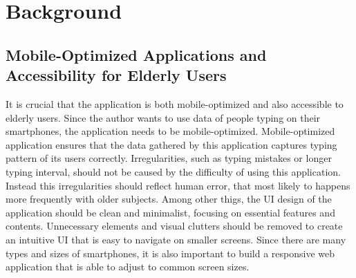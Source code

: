 \chapter{Background}


\section{Mobile-Optimized Applications and Accessibility for Elderly Users}

It is crucial that the application is both mobile-optimized and also accessible to elderly users.
Since the author wants to use data of people typing on their smartphones, the application needs to be mobile-optimized.
Mobile-optimized application ensures that the data gathered by this application captures typing pattern of its users correctly.
Irregularities, such as typing mistakes or longer typing interval, should not be caused by the difficulty of using this application.
Instead this irregularities should reflect human error, that most likely to happens more frequently with older subjects.
Among other thigs, the \ac{UI} design of the application should be clean and minimalist, focusing on essential features and contents.
Unnecessary elements and visual clutters should be removed to create an intuitive \ac{UI} that is easy to navigate on smaller screens.
Since there are many types and sizes of smartphones, it is also important to build a responsive web application that is able to adjust to common screen sizes.

